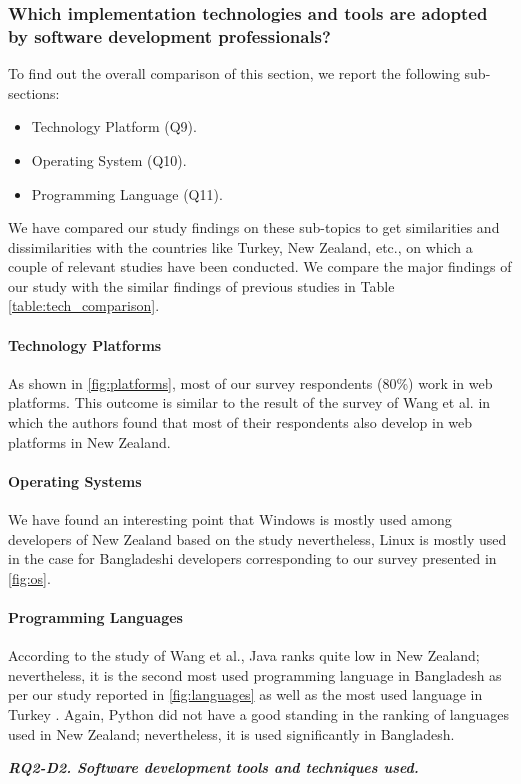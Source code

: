 \subsubsection{Which implementation technologies and tools are adopted by software development professionals?}

To find out the overall comparison of this section, we report the following sub-sections:
\begin{itemize}
\item Technology Platform (Q9).
\item Operating System (Q10).
\item Programming Language (Q11).
\end{itemize}

We have compared our study findings on these sub-topics to get similarities and dissimilarities with the countries like Turkey, New Zealand, etc., on which a couple of relevant studies have been conducted. We compare the major findings of our study with the similar findings of previous studies in Table \ref{table:tech_comparison}.



\paragraph{Technology Platforms}
As shown in \ref{fig:platforms}, most of our survey respondents (80\%) work in web platforms. This outcome is similar to the result of the survey of Wang et al. \citep{Wang2018} in which the authors found that most of their respondents also develop in web platforms in New Zealand.


\paragraph{Operating Systems}
We have found an interesting point that Windows is mostly used among developers of New Zealand based on the study \citep{Wang2018} nevertheless, Linux is mostly used in the case for Bangladeshi developers corresponding to our survey presented in \ref{fig:os}.


\paragraph{Programming Languages}
According to the study of Wang et al.\citep{Wang2018}, Java ranks quite low in New Zealand; nevertheless, it is the second most used programming language in Bangladesh as per our study reported in \ref{fig:languages} as well as the most used language in Turkey \citep{Garousi2015}. Again, Python did not have a good standing in the ranking of languages used in New Zealand; nevertheless, it is used significantly in Bangladesh.

\begin{tcolorbox}[flushleft upper,boxrule=1pt,arc=0pt,left=0pt,right=0pt,top=0pt,bottom=0pt,colback=white,after=\ignorespacesafterend\par\noindent]
\nd\it{\bf{RQ2-D2. Software development tools and techniques used.}} 
\end{tcolorbox}